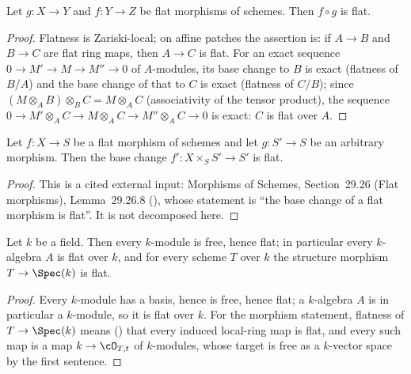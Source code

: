 \begin{lemma}\label{lem:pc-flat-compose}
Let $g:X\to Y$ and $f:Y\to Z$ be flat morphisms of schemes.  Then
$f\circ g$ is flat.
\end{lemma}
\begin{proof}
Flatness is Zariski-local; on affine patches the assertion is: if
$A\to B$ and $B\to C$ are flat ring maps, then $A\to C$ is flat.  For
an exact sequence $0\to M'\to M\to M''\to0$ of $A$-modules, its
base change to $B$ is exact (flatness of $B/A$) and the base change
of that to $C$ is exact (flatness of $C/B$); since
$(M\otimes_AB)\otimes_BC=M\otimes_AC$ (associativity of the tensor
product), the sequence $0\to M'\otimes_AC\to M\otimes_AC\to
M''\otimes_AC\to0$ is exact: $C$ is flat over $A$.
\end{proof}


\begin{lemma}
\label{lem:pc-flat-stable-base-change}
Let $f:X\to S$ be a flat morphism of schemes and let $g:S'\to S$ be an
arbitrary morphism.  Then the base change $f':X\times_SS'\to S'$ is
flat.
\end{lemma}
\begin{proof}
This is a cited external input: Morphisms of Schemes, Section~29.26 (Flat
morphisms), Lemma~29.26.8 (), whose statement is
``the base change of a flat morphism is flat''.  It is not decomposed
here.
\end{proof}

\begin{lemma}\label{lem:pc-flat-field}
Let $k$ be a field.  Then every $k$-module is free, hence flat; in
particular every $k$-algebra $A$ is flat over $k$, and for every scheme
$T$ over $k$ the structure morphism $T\to\Spec(k)$ is flat.
\end{lemma}
\begin{proof}
Every $k$-module has a basis, hence is free, hence flat; a $k$-algebra
$A$ is in particular a $k$-module, so it is flat over $k$.  For the
morphism statement, flatness of $T\to\Spec(k)$ means
() that every induced local-ring map
is flat, and every such map is a map $k\to\cO_{T,t}$ of $k$-modules,
whose target is free as a $k$-vector space by the first sentence.
\end{proof}

